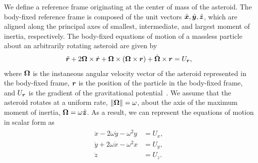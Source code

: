 \documentclass[]{aiaa-tc}%
\begin{document}
We define a reference frame originating at the center of mass of the asteroid.
The body-fixed reference frame is composed of the unit vectors \( \hat{\bm{x}} , \hat{\bm{y}}, \hat{\bm{z}} \), which are aligned along the principal axes of smallest, intermediate, and largest moment of inertia, respectively.
The body-fixed equations of motion of a massless particle about an arbitrarily rotating asteroid are given by
\begin{align}\label{eq:body_eoms}
    \ddot{\bm{r}} + 2 \bm{\Omega} \times \dot{\bm{r}} + \bm{\Omega} \times \left(  \bm{\Omega} \times \bm{r}  \right) + \dot{\bm{\Omega}} \times \bm{r} = U_{\bm{r}} ,
\end{align}
where \( \bm{\Omega} \) is the instaneous angular velocity vector of the asteroid represented in the body-fixed frame, \( \bm{r} \) is the position of the particle in the body-fixed frame, and \( U_{\bm{r}} \) is the gradient of the gravitational potential~\cite{scheeres2012a}.
We assume that the asteroid rotates at a uniform rate, \( \left\| \bm{\Omega} \right\| = \omega \), about the axis of the maximum moment of inertia, \( \bm{\Omega} = \omega \hat{\bm{z} }\).
As a result, we can represent the equations of motion in scalar form as
\begin{align} \label{eq:eoms}
    \begin{split}
        \ddot{x} - 2 \omega \dot{y} - \omega^2 y &= U_x , \\
        \ddot{y} + 2 \omega \dot{x} - \omega^2 x &= U_y , \\
        \ddot{z} &= U_z .
    \end{split}
\end{align}
\end{document}
